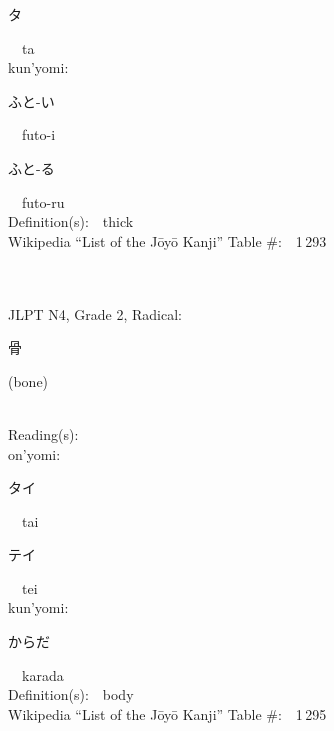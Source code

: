 \begin{multicols}{2}
{\hspace*{2em}}{\begin{CJK}{UTF8}{min} タ \end{CJK}}\ \ ta\ \ \\
{\hspace*{1em}}kun'yomi:\ \ \\
{\hspace*{2em}}{\begin{CJK}{UTF8}{min} ふと-い \end{CJK}}\ \ futo-i\ \ \\
{\hspace*{2em}}{\begin{CJK}{UTF8}{min} ふと-る \end{CJK}}\ \ futo-ru\ \ \\
Definition(s):\ \ thick \\
Wikipedia ``List of the J\=oy\=o Kanji'' Table \#:\ \ 1\,293 \\
\ \ \\
{\fontsize{34pt}{40pt}  }\ \ \\  %
{JLPT N4, Grade 2, Radical:\ \ {\begin{CJK}{UTF8}{min} 骨 \end{CJK}} (bone) } \\
Reading(s):\ \ \\
{\hspace*{1em}}on'yomi:\ \ \\
{\hspace*{2em}}{\begin{CJK}{UTF8}{min} タイ \end{CJK}}\ \ tai\ \ \\
{\hspace*{2em}}{\begin{CJK}{UTF8}{min} テイ \end{CJK}}\ \ tei\ \ \\
{\hspace*{1em}}kun'yomi:\ \ \\
{\hspace*{2em}}{\begin{CJK}{UTF8}{min} からだ \end{CJK}}\ \ karada\ \ \\
Definition(s):\ \ body \\
Wikipedia ``List of the J\=oy\=o Kanji'' Table \#:\ \ 1\,295 \\

\end{multicols}
